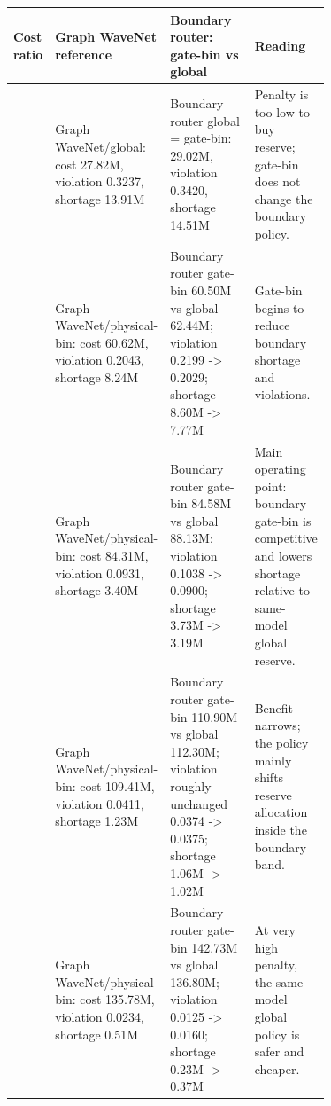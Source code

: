 \begin{tabularx}{\linewidth}{>{\raggedright\arraybackslash}p{0.07\linewidth} >{\raggedright\arraybackslash}p{0.30\linewidth} >{\raggedright\arraybackslash}p{0.34\linewidth} >{\raggedright\arraybackslash}X}
\toprule
Cost ratio & Graph WaveNet reference & Boundary router: gate-bin vs global & Reading \\
\midrule
2 & Graph WaveNet/global: cost 27.82M, violation 0.3237, shortage 13.91M & Boundary router global = gate-bin: 29.02M, violation 0.3420, shortage 14.51M & Penalty is too low to buy reserve; gate-bin does not change the boundary policy. \\
5 & Graph WaveNet/physical-bin: cost 60.62M, violation 0.2043, shortage 8.24M & Boundary router gate-bin 60.50M vs global 62.44M; violation 0.2199 -> 0.2029; shortage 8.60M -> 7.77M & Gate-bin begins to reduce boundary shortage and violations. \\
10 & Graph WaveNet/physical-bin: cost 84.31M, violation 0.0931, shortage 3.40M & Boundary router gate-bin 84.58M vs global 88.13M; violation 0.1038 -> 0.0900; shortage 3.73M -> 3.19M & Main operating point: boundary gate-bin is competitive and lowers shortage relative to same-model global reserve. \\
20 & Graph WaveNet/physical-bin: cost 109.41M, violation 0.0411, shortage 1.23M & Boundary router gate-bin 110.90M vs global 112.30M; violation roughly unchanged 0.0374 -> 0.0375; shortage 1.06M -> 1.02M & Benefit narrows; the policy mainly shifts reserve allocation inside the boundary band. \\
50 & Graph WaveNet/physical-bin: cost 135.78M, violation 0.0234, shortage 0.51M & Boundary router gate-bin 142.73M vs global 136.80M; violation 0.0125 -> 0.0160; shortage 0.23M -> 0.37M & At very high penalty, the same-model global policy is safer and cheaper. \\
\bottomrule
\end{tabularx}
